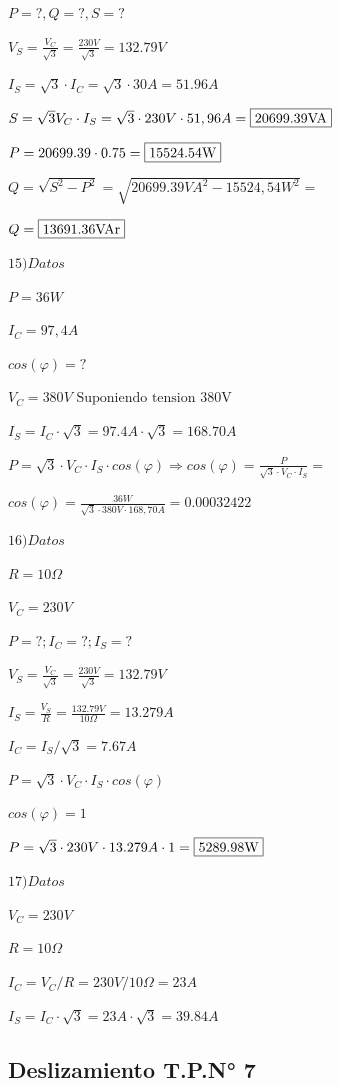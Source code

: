 $P=?,Q=?,S=?$

$V_S=\frac{V_C}{\sqrt{3}}=\frac{230V}{\sqrt{3}}=132.79V$

$I_S=\sqrt{3} \cdot I_C=\sqrt{3}\cdot 30A=51.96A$

$S=\sqrt{3}V_C \cdot I_S=\sqrt{3} \cdot 230V \cdot 51,96A= \fbox{20699.39VA}$

$P=20699.39 \cdot 0.75=\fbox{15524.54W}$

$Q=\sqrt{S^2-P^2}=\sqrt{20699.39VA^2-15524,54W^2}=$

$Q=\fbox{13691.36VAr}$

\vspace{1cm}

$15)Datos$

$P=36W$

$I_C=97,4A$

$cos(\varphi)=?$

$V_C=380V \text{ Suponiendo tension 380V}$

$I_S= I_C \cdot \sqrt{3}=97.4 A\cdot \sqrt{3}=168.70A$

$P= \sqrt{3}\cdot V_C\cdot I_S\cdot cos(\varphi)\Rightarrow cos(\varphi)=\frac{P}{\sqrt{3}\cdot V_C\cdot I_S}=$

$cos(\varphi)=\frac{36W}{\sqrt{3}\cdot 380V\cdot 168,70A}=0.00032422$


\vspace{1cm}

$16)Datos$

$R=10\Omega$

$V_C=230V$

$P=?;I_C=?;I_S=?$

$V_S = \frac{V_C}{\sqrt{3}}=\frac{230V}{\sqrt{3}}=132.79V$

$I_S=\frac{V_S}{R}=\frac{132.79V}{10\Omega}=13.279A$

$I_C=I_S/\sqrt{3}=7.67A$

$P= \sqrt{3}\cdot V_C\cdot I_S\cdot cos(\varphi)$

$cos(\varphi)=1$

$P= \sqrt{3}\cdot 230V\cdot 13.279A\cdot 1=\fbox{5289.98W}$


\vspace{1cm}

$17)Datos$

$V_C=230V$

$R=10\Omega$

$I_C=V_C/R=230V/10\Omega=23A$

$I_S=I_C\cdot \sqrt{3}=23A\cdot \sqrt{3}=39.84A$

\subsection{Deslizamiento T.P.N° 7}



